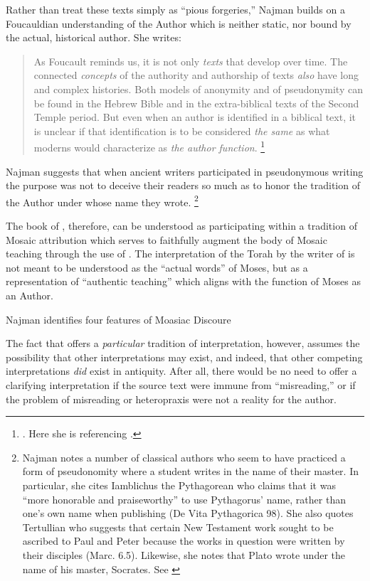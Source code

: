 Rather than treat these \psgraphical texts simply as ``pious forgeries,'' Najman builds on a Foucauldian understanding of the Author which is neither static, nor bound by the actual, historical author. She writes:

\begin{quote}
    As Foucault reminds us, it is not only \emph{texts} that develop over time. The connected \emph{concepts} of the authority and authorship of texts \emph{also} have long and complex histories. Both models of anonymity and of pseudonymity can be found in the Hebrew Bible and in the extra-biblical texts of the Second Temple period. But even when an author is identified in a biblical text, it is unclear if that identification is to be considered \emph{the same} as what moderns would characterize as \emph{the author function}.%
        \footnote{\cite[9--10]{najman2003}. Here she is referencing \cite[213]{foucault_essential-foucault_2}.}
\end{quote}
\noindent
Najman suggests that when ancient writers participated in pseudonymous writing the purpose was not to deceive their readers so much as to honor the tradition of the Author under whose name they wrote.%
    \footnote{Najman notes a number of classical authors who seem to have practiced a form of pseudonomity where a student writes in the name of their master. In particular, she cites Iamblichus the Pythagorean who claims that it was ``more honorable and praiseworthy'' to use Pythagorus' name, rather than one's own name when publishing (De Vita Pythagorica 98). She also quotes Tertullian who suggests that certain New Testament work sought to be ascribed to Paul and Peter because the works in question were written by their disciples (Marc. 6.5). Likewise, she notes that Plato wrote under the name of his master, Socrates. See \cite[13]{najman2003}}

The book of \jub, therefore, can be understood as participating within a tradition of Mosaic attribution which serves to faithfully augment the body of Mosaic teaching through the use of \psy. The interpretation of the Torah by the writer of \jub is not meant to be understood as the ``actual words'' of Moses, but as a representation of ``authentic teaching'' which aligns with the function of Moses as an Author.\autocite[13]{najman2003}

Najman identifies four features of Moasiac Discoure 



The fact that \jub offers a \emph{particular} tradition of interpretation, however, assumes the possibility that other interpretations may exist, and indeed, that other competing interpretations \emph{did} exist in antiquity. After all, there would be no need to offer a clarifying interpretation if the source text were immune from ``misreading,'' or if the problem of misreading or heteropraxis were not a reality for the author. 



